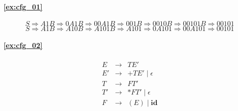 \paragraph{\ref{ex:cfg_01}}

\[
 S \Rightarrow A1B \Rightarrow 0A1B \Rightarrow 00A1B \Rightarrow
 001B \Rightarrow 0010B \Rightarrow 00101B \Rightarrow 00101
\]
\[
 S \Rightarrow A1B \Rightarrow A10B \Rightarrow A101B \Rightarrow
 A101 \Rightarrow 0A101 \Rightarrow 00A101 \Rightarrow 00101
\]

\paragraph{\ref{ex:cfg_02}}

\begin{eqnarray*}
 E & \rightarrow & TE' \\
 E' & \rightarrow & + TE' \mid \epsilon \\
 T & \rightarrow & FT' \\
 T' & \rightarrow & * FT' \mid \epsilon \\
 F & \rightarrow & (E) \mid \mathbf{id}
\end{eqnarray*}
